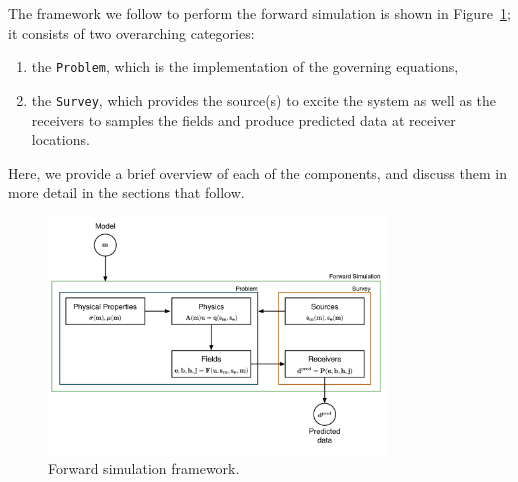\documentclass[preprint,review,3p,times,onecolumn,authoryear]{elsarticle}
\newcommand{\Survey}{\texttt{Survey}\xspace}
\newcommand{\Problem}{\texttt{Problem}\xspace}
\begin{document}
The framework we follow to perform the forward simulation is shown in
Figure~\ref{fig:simpegFwd}; it consists of two overarching categories:
\begin{enumerate}
\item the \Problem, which is the implementation of the governing equations,
\item the \Survey, which provides the source(s) to excite the system as well as the receivers to samples the fields and produce predicted data at receiver locations.
\end{enumerate}
Here, we provide a brief overview of each of the components, and discuss them
in more detail in the sections that follow.
{%
\begin{figure}[htb!]
    \centering
    \includegraphics[width=0.8\textwidth]{images/simpegEM_withMath_6.png}
\caption{Forward simulation framework.}
\label{fig:simpegFwd}
\end{figure}
}
\end{document}
